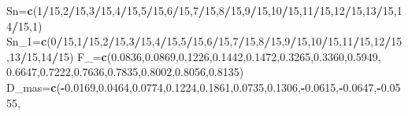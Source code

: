 \documentclass[
  a4paper,
  oneside,
  openany]{book}
\newenvironment{Shaded}{\begin{snugshade}}{\end{snugshade}}
\newcommand{\DecValTok}[1]{\textcolor[rgb]{0.00,0.00,0.81}{#1}}
\newcommand{\FloatTok}[1]{\textcolor[rgb]{0.00,0.00,0.81}{#1}}
\newcommand{\KeywordTok}[1]{\textcolor[rgb]{0.13,0.29,0.53}{\textbf{#1}}}
\newcommand{\NormalTok}[1]{#1}
\newcommand{\OperatorTok}[1]{\textcolor[rgb]{0.81,0.36,0.00}{\textbf{#1}}}
\begin{document}
\begin{Shaded}
\begin{Highlighting}[]
\NormalTok{Sn=}\KeywordTok{c}\NormalTok{(}\DecValTok{1}\OperatorTok{/}\DecValTok{15}\NormalTok{,}\DecValTok{2}\OperatorTok{/}\DecValTok{15}\NormalTok{,}\DecValTok{3}\OperatorTok{/}\DecValTok{15}\NormalTok{,}\DecValTok{4}\OperatorTok{/}\DecValTok{15}\NormalTok{,}\DecValTok{5}\OperatorTok{/}\DecValTok{15}\NormalTok{,}\DecValTok{6}\OperatorTok{/}\DecValTok{15}\NormalTok{,}\DecValTok{7}\OperatorTok{/}\DecValTok{15}\NormalTok{,}\DecValTok{8}\OperatorTok{/}\DecValTok{15}\NormalTok{,}\DecValTok{9}\OperatorTok{/}\DecValTok{15}\NormalTok{,}\DecValTok{10}\OperatorTok{/}\DecValTok{15}\NormalTok{,}\DecValTok{11}\OperatorTok{/}\DecValTok{15}\NormalTok{,}\DecValTok{12}\OperatorTok{/}\DecValTok{15}\NormalTok{,}\DecValTok{13}\OperatorTok{/}\DecValTok{15}\NormalTok{,}\DecValTok{14}\OperatorTok{/}\DecValTok{15}\NormalTok{,}\DecValTok{1}\NormalTok{)}
\NormalTok{Sn\_}\DecValTok{1}\NormalTok{=}\KeywordTok{c}\NormalTok{(}\DecValTok{0}\OperatorTok{/}\DecValTok{15}\NormalTok{,}\DecValTok{1}\OperatorTok{/}\DecValTok{15}\NormalTok{,}\DecValTok{2}\OperatorTok{/}\DecValTok{15}\NormalTok{,}\DecValTok{3}\OperatorTok{/}\DecValTok{15}\NormalTok{,}\DecValTok{4}\OperatorTok{/}\DecValTok{15}\NormalTok{,}\DecValTok{5}\OperatorTok{/}\DecValTok{15}\NormalTok{,}\DecValTok{6}\OperatorTok{/}\DecValTok{15}\NormalTok{,}\DecValTok{7}\OperatorTok{/}\DecValTok{15}\NormalTok{,}\DecValTok{8}\OperatorTok{/}\DecValTok{15}\NormalTok{,}\DecValTok{9}\OperatorTok{/}\DecValTok{15}\NormalTok{,}\DecValTok{10}\OperatorTok{/}\DecValTok{15}\NormalTok{,}\DecValTok{11}\OperatorTok{/}\DecValTok{15}\NormalTok{,}\DecValTok{12}\OperatorTok{/}\DecValTok{15}\NormalTok{,}\DecValTok{13}\OperatorTok{/}\DecValTok{15}\NormalTok{,}\DecValTok{14}\OperatorTok{/}\DecValTok{15}\NormalTok{)}
\NormalTok{F\_=}\KeywordTok{c}\NormalTok{(}\FloatTok{0.0836}\NormalTok{,}\FloatTok{0.0869}\NormalTok{,}\FloatTok{0.1226}\NormalTok{,}\FloatTok{0.1442}\NormalTok{,}\FloatTok{0.1472}\NormalTok{,}\FloatTok{0.3265}\NormalTok{,}\FloatTok{0.3360}\NormalTok{,}\FloatTok{0.5949}\NormalTok{,}
                    \FloatTok{0.6647}\NormalTok{,}\FloatTok{0.7222}\NormalTok{,}\FloatTok{0.7636}\NormalTok{,}\FloatTok{0.7835}\NormalTok{,}\FloatTok{0.8002}\NormalTok{,}\FloatTok{0.8056}\NormalTok{,}\FloatTok{0.8135}\NormalTok{)}
\NormalTok{D\_mas=}\KeywordTok{c}\NormalTok{(}\OperatorTok{{-}}\FloatTok{0.0169}\NormalTok{,}\FloatTok{0.0464}\NormalTok{,}\FloatTok{0.0774}\NormalTok{,}\FloatTok{0.1224}\NormalTok{,}\FloatTok{0.1861}\NormalTok{,}\FloatTok{0.0735}\NormalTok{,}\FloatTok{0.1306}\NormalTok{,}\OperatorTok{{-}}\FloatTok{0.0615}\NormalTok{,}\OperatorTok{{-}}\FloatTok{0.0647}\NormalTok{,}\OperatorTok{{-}}\FloatTok{0.0555}\NormalTok{,}

\end{Highlighting}
\end{Shaded}
\end{document}
